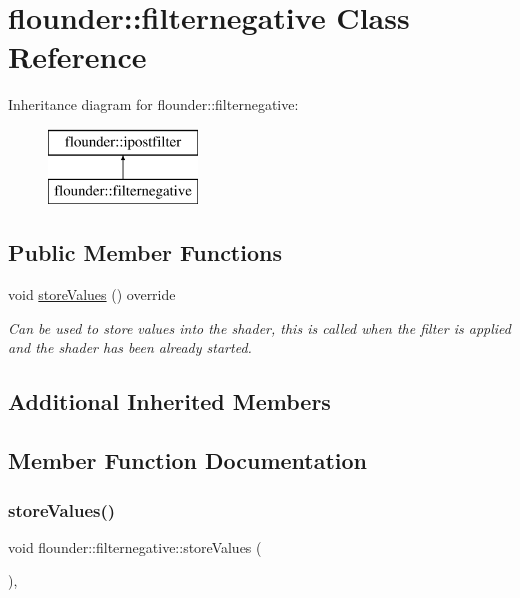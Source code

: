 \hypertarget{classflounder_1_1filternegative}{}\section{flounder\+:\+:filternegative Class Reference}
\label{classflounder_1_1filternegative}
Inheritance diagram for flounder\+:\+:filternegative\+:\begin{figure}[H]
\begin{center}
\leavevmode
\includegraphics[height=2.000000cm]{classflounder_1_1filternegative}
\end{center}
\end{figure}
\subsection*{Public Member Functions}
\begin{DoxyCompactItemize}
\item 
void \hyperlink{classflounder_1_1filternegative_abc832140c4d75f4684d3470e070bcf7a}{store\+Values} () override
\begin{DoxyCompactList}\small\item\em Can be used to store values into the shader, this is called when the filter is applied and the shader has been already started. \end{DoxyCompactList}\end{DoxyCompactItemize}
\subsection*{Additional Inherited Members}


\subsection{Member Function Documentation}
\mbox{\label{classflounder_1_1filternegative_abc832140c4d75f4684d3470e070bcf7a}} 
\subsubsection{\texorpdfstring{store\+Values()}{storeValues()}}
{\footnotesize\ttfamily void flounder\+::filternegative\+::store\+Values (\begin{DoxyParamCaption}{ }\end{DoxyParamCaption})\hspace{0.3cm}{\ttfamily [override]}, {\ttfamily [virtual]}}



